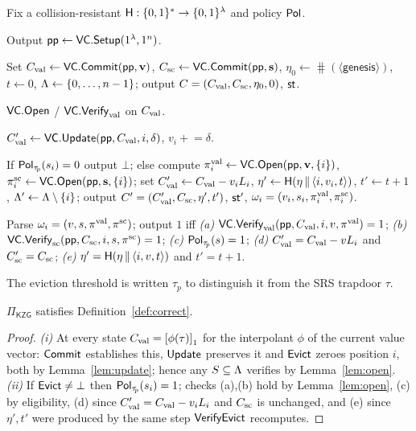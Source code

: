 \begin{construction}\label{con:evictvc}
Fix a collision-resistant $\mathsf{H}:\{0,1\}^{*}\to\{0,1\}^{\lambda}$ and policy $\mathsf{Pol}$.
\begin{description}[leftmargin=0em,itemsep=4pt]
\item[$\Setup(1^\secpar,1^{n})$.] Output $\mathsf{pp}\leftarrow\mathsf{VC}.\mathsf{Setup}(1^\lambda,1^{n})$.
\item[$\Commit(\pp,\mathbf{v},\mathbf{s})$.] Set
      $C_{\mathrm{val}}\leftarrow\mathsf{VC}.\mathsf{Commit}(\mathsf{pp},\mathbf{v})$,
      $C_{\mathrm{sc}}\leftarrow\mathsf{VC}.\mathsf{Commit}(\mathsf{pp},\mathbf{s})$,
      $\eta_0\leftarrow\hash(\langle\textsf{genesis}\rangle)$, $t\leftarrow0$,
      $\Lambda\leftarrow\{0,\dots,n-1\}$; output $C=(C_{\mathrm{val}},C_{\mathrm{sc}},\eta_0,0)$, $\mathsf{st}$.
\item[$\Open/\Vfy$.] $\mathsf{VC}.\mathsf{Open}$ / $\mathsf{VC}.\mathsf{Verify}_{\mathrm{val}}$ on $C_{\mathrm{val}}$.
\item[$\Update(\pp,\aux,i,\delta)$.]
      $C_{\mathrm{val}}'\leftarrow\mathsf{VC}.\mathsf{Update}(\mathsf{pp},C_{\mathrm{val}},i,\delta)$, $v_i\mathrel{+}=\delta$.
\item[$\Evict(\pp,\aux,i,\tau_{\!p})$.] If $\mathsf{Pol}_{\tau_{\!p}}(s_i)=0$ output
      $\bot$; else compute $\pi_i^{\mathrm{val}}\leftarrow\mathsf{VC}.\mathsf{Open}(\mathsf{pp},\mathbf{v},\{i\})$,
      $\pi_i^{\mathrm{sc}}\leftarrow\mathsf{VC}.\mathsf{Open}(\mathsf{pp},\mathbf{s},\{i\})$; set
      $C_{\mathrm{val}}'\leftarrow C_{\mathrm{val}}-v_i L_i$,
      $\eta'\leftarrow\mathsf{H}(\eta\,\|\,\langle i,v_i,t\rangle)$, $t'\leftarrow t+1$,
      $\Lambda'\leftarrow\Lambda\setminus\{i\}$; output $C'=(C_{\mathrm{val}}',C_{\mathrm{sc}},\eta',t')$,
      $\mathsf{st}'$, $\omega_i=(v_i,s_i,\pi_i^{\mathrm{val}},\pi_i^{\mathrm{sc}})$.
\item[$\VfyEvict(\pp,C,i,\tau_{\!p},\omega_i,C')$.] Parse
      $\omega_i=(v,s,\pi^{\mathrm{val}},\pi^{\mathrm{sc}})$; output $1$ iff
      \emph{(a)} $\mathsf{VC}.\mathsf{Verify}_{\mathrm{val}}(\mathsf{pp},C_{\mathrm{val}},i,v,\pi^{\mathrm{val}})=1$;
      \emph{(b)} $\mathsf{VC}.\mathsf{Verify}_{\mathrm{sc}}(\mathsf{pp},C_{\mathrm{sc}},i,s,\pi^{\mathrm{sc}})=1$;
      \emph{(c)} $\mathsf{Pol}_{\tau_{\!p}}(s)=1$;
      \emph{(d)} $C_{\mathrm{val}}'=C_{\mathrm{val}}-v L_i$ and $C_{\mathrm{sc}}'=C_{\mathrm{sc}}$;
      \emph{(e)} $\eta'=\mathsf{H}(\eta\,\|\,\langle i,v,t\rangle)$ and $t'=t+1$.
\end{description}
\end{construction}

\noindent The eviction threshold is written $\tau_{\!p}$ to distinguish it from
the SRS trapdoor $\tau$.

\begin{theorem}[Correctness]\label{thm:correct}
$\Pi_{\mathsf{KZG}}$ satisfies Definition~\ref{def:correct}.
\end{theorem}
\begin{proof}
\emph{(i)} At every state $C_{\mathrm{val}}=\left[\phi(\tau)\right]_{1}$ for the interpolant $\phi$ of
the current value vector: $\mathsf{Commit}$ establishes this, $\mathsf{Update}$ preserves it and
$\mathsf{Evict}$ zeroes position $i$, both by Lemma~\ref{lem:update}; hence any
$S\subseteq\Lambda$ verifies by Lemma~\ref{lem:open}. \emph{(ii)} If
$\mathsf{Evict}\neq\bot$ then $\mathsf{Pol}_{\tau_{\!p}}(s_i)=1$; checks (a),(b) hold by
Lemma~\ref{lem:open}, (c) by eligibility, (d) since $C_{\mathrm{val}}'=C_{\mathrm{val}}-v_iL_i$ and
$C_{\mathrm{sc}}$ is unchanged, and (e) since $\eta',t'$ were produced by the same step
$\mathsf{VerifyEvict}$ recomputes.
\end{proof}

